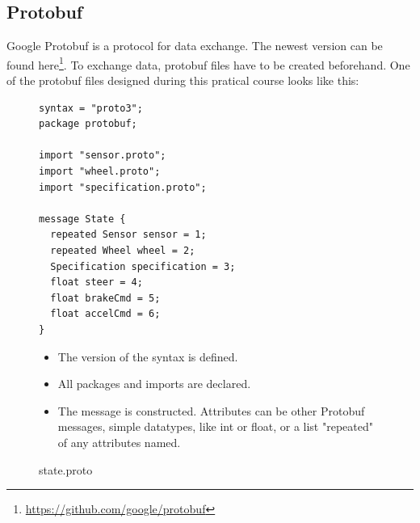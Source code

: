 \documentclass[paper=a4, fontsize=11pt]{scrreprt}
\begin{document}
  \subsection{Protobuf}\label{ar_protobuf_subsection}
Google Protobuf is a protocol for data exchange.
The newest version can be found here\footnote{\url{https://github.com/google/protobuf}}.
To exchange data, protobuf files have to be created beforehand.
One of the protobuf files designed during this pratical course looks like this:
\begin{figure}[!h]
\begin{minipage}{0.5\textwidth}
\centering
  \begin{verbatim}
syntax = "proto3";
package protobuf;

import "sensor.proto";
import "wheel.proto";
import "specification.proto";

message State {
  repeated Sensor sensor = 1;
  repeated Wheel wheel = 2;
  Specification specification = 3;
  float steer = 4;
  float brakeCmd = 5;
  float accelCmd = 6;
}
  \end{verbatim}
\end{minipage}
  \begin{minipage}{0.5\textwidth}
    \begin{itemize}
\item The version of the syntax is defined.
\item All packages and imports are declared.
\item The message is constructed. Attributes can be other Protobuf messages, simple datatypes, like int or float, or a list "repeated" of any attributes named.
    \end{itemize}
  \end{minipage}
    \caption{state.proto}
  \end{figure}
\end{document}
